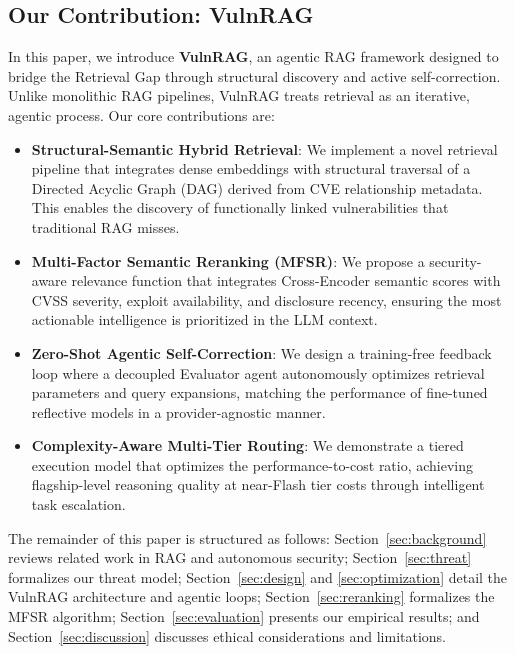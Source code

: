 \subsection{Our Contribution: VulnRAG}
In this paper, we introduce \textbf{VulnRAG}, an agentic RAG framework designed to bridge the Retrieval Gap through structural discovery and active self-correction. Unlike monolithic RAG pipelines, VulnRAG treats retrieval as an iterative, agentic process. Our core contributions are:

\begin{itemize}
    \item \textbf{Structural-Semantic Hybrid Retrieval}: We implement a novel retrieval pipeline that integrates dense embeddings with structural traversal of a Directed Acyclic Graph (DAG) derived from CVE relationship metadata. This enables the discovery of functionally linked vulnerabilities that traditional RAG misses.
    \item \textbf{Multi-Factor Semantic Reranking (MFSR)}: We propose a security-aware relevance function that integrates Cross-Encoder semantic scores with CVSS severity, exploit availability, and disclosure recency, ensuring the most actionable intelligence is prioritized in the LLM context.
    \item \textbf{Zero-Shot Agentic Self-Correction}: We design a training-free feedback loop where a decoupled Evaluator agent autonomously optimizes retrieval parameters and query expansions, matching the performance of fine-tuned reflective models in a provider-agnostic manner.
    \item \textbf{Complexity-Aware Multi-Tier Routing}: We demonstrate a tiered execution model that optimizes the performance-to-cost ratio, achieving flagship-level reasoning quality at near-Flash tier costs through intelligent task escalation.
\end{itemize}

The remainder of this paper is structured as follows: Section~\ref{sec:background} reviews related work in RAG and autonomous security; Section~\ref{sec:threat} formalizes our threat model; Section~\ref{sec:design} and \ref{sec:optimization} detail the VulnRAG architecture and agentic loops; Section~\ref{sec:reranking} formalizes the MFSR algorithm; Section~\ref{sec:evaluation} presents our empirical results; and Section~\ref{sec:discussion} discusses ethical considerations and limitations.
